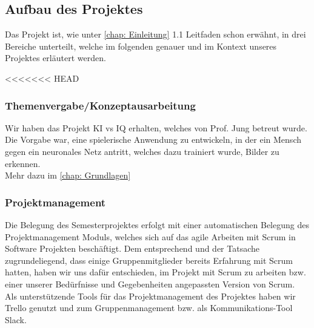 \documentclass[11pt]{article}
\begin{document}
\subsection{Aufbau des Projektes}

Das Projekt ist, wie unter \autoref{chap: Einleitung} 1.1 Leitfaden schon erwähnt, in drei Bereiche unterteilt, welche im folgenden genauer und im Kontext unseres Projektes erläutert werden.

<<<<<<< HEAD
\subsubsection{ Themenvergabe/Konzeptausarbeitung }
\label{chap: Themenvergabe}

Wir haben das Projekt KI vs IQ erhalten, welches von Prof. Jung 		betreut wurde.\\
Die Vorgabe war, eine spielerische Anwendung zu entwickeln, 			in der ein Mensch gegen ein neuronales Netz antritt, welches 			dazu trainiert wurde, Bilder zu erkennen.\\
Mehr dazu im \autoref{chap: Grundlagen}
	
\subsubsection{  Projektmanagement }
\label{chap: Projektmanagement}
Die Belegung des Semesterprojektes erfolgt mit einer 						automatischen Belegung des Projektmanagement Moduls, 				welches sich auf das agile Arbeiten mit Scrum in Software 				Projekten beschäftigt. Dem entsprechend und der Tatsache 				zugrundeliegend, dass einige Gruppenmitglieder bereits 					Erfahrung mit Scrum hatten, haben wir uns dafür entschieden, im 	Projekt mit Scrum zu arbeiten bzw. einer unserer 						Bedürfnisse und Gegebenheiten angepassten Version von 				Scrum.\\
Als unterstützende Tools für das Projektmanagement des Projektes haben wir 	Trello genutzt und zum Gruppenmanagement bzw. als 		Kommunikations-Tool Slack.
\end{document}

